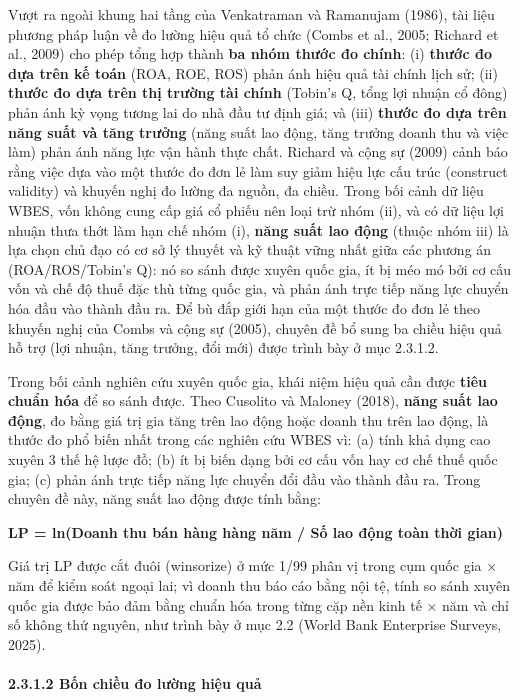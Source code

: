 \documentclass[
  a4paper,
  13pt]{extreport}
\begin{document}
Vượt ra ngoài khung hai tầng của Venkatraman và Ramanujam (1986), tài
liệu phương pháp luận về đo lường hiệu quả tổ chức (Combs et al., 2005;
Richard et al., 2009) cho phép tổng hợp thành \textbf{ba nhóm thước đo
chính}: (i) \textbf{thước đo dựa trên kế toán} (ROA, ROE, ROS) phản ánh
hiệu quả tài chính lịch sử; (ii) \textbf{thước đo dựa trên thị trường
tài chính} (Tobin's Q, tổng lợi nhuận cổ đông) phản ánh kỳ vọng tương
lai do nhà đầu tư định giá; và (iii) \textbf{thước đo dựa trên năng suất
và tăng trưởng} (năng suất lao động, tăng trưởng doanh thu và việc làm)
phản ánh năng lực vận hành thực chất. Richard và cộng sự (2009) cảnh báo
rằng việc dựa vào một thước đo đơn lẻ làm suy giảm hiệu lực cấu trúc
(construct validity) và khuyến nghị đo lường đa nguồn, đa chiều. Trong
bối cảnh dữ liệu WBES, vốn không cung cấp giá cổ phiếu nên loại trừ nhóm
(ii), và có dữ liệu lợi nhuận thưa thớt làm hạn chế nhóm (i),
\textbf{năng suất lao động} (thuộc nhóm iii) là lựa chọn chủ đạo có cơ
sở lý thuyết và kỹ thuật vững nhất giữa các phương án (ROA/ROS/Tobin's
Q): nó so sánh được xuyên quốc gia, ít bị méo mó bởi cơ cấu vốn và chế
độ thuế đặc thù từng quốc gia, và phản ánh trực tiếp năng lực chuyển hóa
đầu vào thành đầu ra. Để bù đắp giới hạn của một thước đo đơn lẻ theo
khuyến nghị của Combs và cộng sự (2005), chuyên đề bổ sung ba chiều hiệu
quả hỗ trợ (lợi nhuận, tăng trưởng, đổi mới) được trình bày ở mục
2.3.1.2.

Trong bối cảnh nghiên cứu xuyên quốc gia, khái niệm hiệu quả cần được
\textbf{tiêu chuẩn hóa} để so sánh được. Theo Cusolito và Maloney
(2018), \textbf{năng suất lao động}, đo bằng giá trị gia tăng trên lao
động hoặc doanh thu trên lao động, là thước đo phổ biến nhất trong các
nghiên cứu WBES vì: (a) tính khả dụng cao xuyên 3 thế hệ lược đồ; (b) ít
bị biến dạng bởi cơ cấu vốn hay cơ chế thuế quốc gia; (c) phản ánh trực
tiếp năng lực chuyển đổi đầu vào thành đầu ra. Trong chuyên đề này, năng
suất lao động được tính bằng:

\textbf{LP = ln(Doanh thu bán hàng hàng năm / Số lao động toàn thời
gian)}

Giá trị LP được cắt đuôi (winsorize) ở mức 1/99 phân vị trong cụm quốc
gia × năm để kiểm soát ngoại lai; vì doanh thu báo cáo bằng nội tệ, tính
so sánh xuyên quốc gia được bảo đảm bằng chuẩn hóa trong từng cặp nền
kinh tế × năm và chỉ số không thứ nguyên, như trình bày ở mục 2.2 (World
Bank Enterprise Surveys, 2025).

\hypertarget{bux1ed1n-chiux1ec1u-ux111o-lux1b0ux1eddng-hiux1ec7u-quux1ea3}{%
\paragraph{2.3.1.2 Bốn chiều đo lường hiệu
quả}\label{bux1ed1n-chiux1ec1u-ux111o-lux1b0ux1eddng-hiux1ec7u-quux1ea3}}
\end{document}
